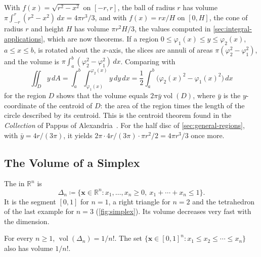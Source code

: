 With $f(x)=\sqrt{r^2-x^2}$ on $[-r,r]$, the ball of radius $r$ has volume $\pi\int_{-r}^r(r^2-x^2)\,dx=4\pi r^3/3$, and with $f(x)=rx/H$ on $[0,H]$, the cone of radius $r$ and height $H$ has volume $\pi r^2H/3$, the values computed in \cref{sec:integral-applications}, which are now theorems. If a region $0\le\varphi_1(x)\le y\le\varphi_2(x)$, $a\le x\le b$, is rotated about the $x$-axis, the slices are annuli of areas $\pi(\varphi_2^2-\varphi_1^2)$, and the volume is $\pi\int_a^b(\varphi_2^2-\varphi_1^2)\,dx$. Comparing with
\[
\iint_Dy\,dA=\int_a^b\int_{\varphi_1(x)}^{\varphi_2(x)}y\,dy\,dx=\frac12\int_a^b\bigl(\varphi_2(x)^2-\varphi_1(x)^2\bigr)\,dx
\]
for the region $D$ shows that the volume equals $2\pi\bar y\operatorname{vol}(D)$, where $\bar y$ is the $y$-coordinate of the centroid of $D$: the area of the region times the length of the circle described by its centroid. This is the centroid theorem found in the \emph{Collection} of Pappus of Alexandria~\cite{heath1921}. For the half disc of \cref{sec:general-regions}, with $\bar y=4r/(3\pi)$, it yields $2\pi\cdot4r/(3\pi)\cdot\pi r^2/2=4\pi r^3/3$ once more.

\subsection{The Volume of a Simplex}

The  in $\mathbb R^n$ is
\[
\Delta_n\coloneqq\{\mathbf x\in\mathbb R^n: x_1,\ldots,x_n\ge0,\ x_1+\cdots+x_n\le1\}.
\]
It is the segment $[0,1]$ for $n=1$, a right triangle for $n=2$ and the tetrahedron of the last example for $n=3$ (\cref{fig:simplex}). Its volume decreases very fast with the dimension.

\begin{proposition}
\label{prop:simplex}
For every $n\ge1$, $\operatorname{vol}(\Delta_n)=1/n!$. The set $\{\mathbf x\in[0,1]^n: x_1\le x_2\le\cdots\le x_n\}$ also has volume $1/n!$.
\end{proposition}

